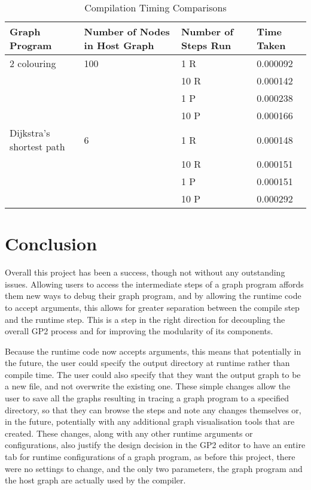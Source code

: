 \documentclass{UoYCSproject}
\begin{document}
\begin{table}
\centering
\begin{tabular}{l | l | l | l}
	Graph Program & Number of Nodes in Host Graph & Number of Steps Run & Time Taken \\
	\hline
	2 colouring              & 100 & 1  R & 0.000092 \\
	                         &     & 10 R & 0.000142 \\
	                         &     & 1  P & 0.000238 \\
	                         &     & 10 P & 0.000166 \\
	\hline
	Dijkstra's shortest path & 6   & 1  R & 0.000148 \\
	                         &     & 10 R & 0.000151 \\
	                         &     & 1  P & 0.000151 \\
	                         &     & 10 P & 0.000292 \\
\end{tabular}
\caption{Compilation Timing Comparisons}
\label{table:step_execution_timings}
\end{table}

\chapter{Conclusion}

Overall this project has been a success, though not without any outstanding issues. Allowing users to access the intermediate steps of a graph program affords them new ways to debug their graph program, and by allowing the runtime code to accept arguments, this allows for greater separation between the compile step and the runtime step. This is a step in the right direction for decoupling the overall GP2 process and for improving the modularity of its components.

Because the runtime code now accepts arguments, this means that potentially in the future, the user could specify the output directory at runtime rather than compile time. The user could also specify that they want the output graph to be a new file, and not overwrite the existing one. These simple changes allow the user to save all the graphs resulting in tracing a graph program to a specified directory, so that they can browse the steps and note any changes themselves or, in the future, potentially with any additional graph visualisation tools that are created. These changes, along with any other runtime arguments or configurations, also justify the design decision in the GP2 editor to have an entire tab for runtime configurations of a graph program, as before this project, there were no settings to change, and the only two parameters, the graph program and the host graph are actually used by the compiler.
\end{document}
